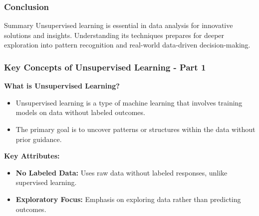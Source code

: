 \documentclass[aspectratio=169]{beamer}
\begin{document}
\begin{frame}[fragile]
    \frametitle{Conclusion}
    \begin{block}{Summary}
        Unsupervised learning is essential in data analysis for innovative solutions and insights. Understanding its techniques prepares for deeper exploration into pattern recognition and real-world data-driven decision-making.
    \end{block}
\end{frame}

\begin{frame}[fragile]
    \frametitle{Key Concepts of Unsupervised Learning - Part 1}
    
    \textbf{What is Unsupervised Learning?}
    
    \begin{itemize}
        \item Unsupervised learning is a type of machine learning that involves training models on data without labeled outcomes.
        \item The primary goal is to uncover patterns or structures within the data without prior guidance.
    \end{itemize}
    
    \textbf{Key Attributes:}
    \begin{itemize}
        \item \textbf{No Labeled Data:} Uses raw data without labeled responses, unlike supervised learning.
        \item \textbf{Exploratory Focus:} Emphasis on exploring data rather than predicting outcomes.
    \end{itemize}
    
\end{frame}
\end{document}
